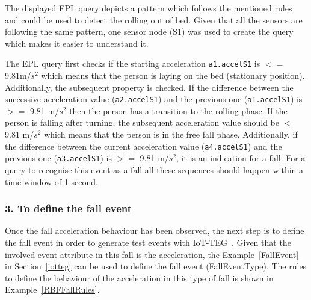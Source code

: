 \documentclass[journal]{IEEEtran}
\begin{document}
The displayed EPL query depicts a pattern which follows the mentioned rules and could be used to detect the rolling out of bed. 
Given that all the sensors are following the same pattern, one sensor node (S1) was used to create the query which makes it easier to understand it. 
% 

The EPL query first checks if the starting acceleration \texttt{\small{a1.accelS1}} is $<=$ 9.81m/$s^2$ which means that the person is laying 
on the bed (stationary position). Additionally, the subsequent property is checked. If the difference between the successive 
acceleration value (\texttt{\small{a2.accelS1}}) and the previous one (\texttt{\small{a1.accelS1}}) is $>=$ 9.81 m/$s^2$ then the person has a transition to 
the rolling phase. If the person is falling after turning, the subsequent acceleration value should be $<$ 9.81 m/$s^2$ 
which means that the person is in the free fall phase. Additionally, if the difference between the current acceleration value 
(\texttt{\small{a4.accelS1}}) and the previous one (\texttt{\small{a3.accelS1}}) is
$>=$ 9.81 m/$s^2$, it is an indication for a fall. For a query to
recognise this event as a fall all these sequences should happen within a time window of 1 second.

\subsubsection*{3. To define the fall event} Once the fall acceleration behaviour has been observed, the next step is to define the 
fall event in order to generate test events with IoT-TEG~\cite{TesisGutierrez2017,Gutierrez2017}. Given that the involved event 
attribute in this fall is the acceleration, the Example~\ref{FallEvent} in Section~\ref{iotteg} can be used to define 
the fall event (FallEventType). The rules to define the behaviour of the acceleration in this type of fall is shown in 
Example~\ref{RBFFallRules}.
\end{document}
